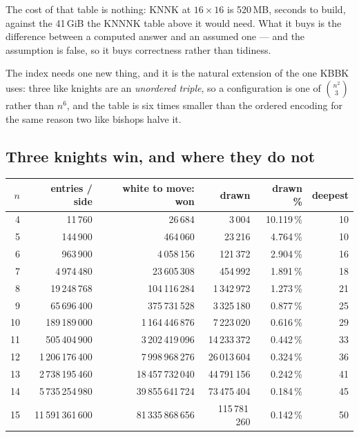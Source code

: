 \documentclass[11pt]{article}
\begin{document}
\noindent
The cost of that table is nothing: KNNK at $16\times16$ is 520\,MB, seconds to
build, against the 41\,GiB the KNNNK table above it would need. What it buys is
the difference between a computed answer and an assumed one --- and the
assumption is false, so it buys correctness rather than tidiness.

\smallskip
\noindent
The index needs one new thing, and it is the natural extension of the one KBBK
uses: three like knights are an \emph{unordered triple}, so a configuration is
one of $\binom{n^2}{3}$ rather than $n^6$, and the table is six times smaller
than the ordered encoding for the same reason two like bishops halve it.

\subsection{Three knights win, and where they do not}\label{sub:kn-win}

\begin{center}\small
\begin{tabular}{@{}rrrrrr@{}}
\toprule
$n$ & \textbf{entries / side} & \textbf{white to move: won} &
\textbf{drawn} & \textbf{drawn \%} & \textbf{deepest} \\
\midrule
 4 &          11\,760 &            26\,684 &        3\,004 & 10.119\,\% & 10 \\
 5 &        144\,900 &          464\,060 &      23\,216 &  4.764\,\% & 10 \\
 6 &        963\,900 &      4\,058\,156 &    121\,372 &  2.904\,\% & 16 \\
 7 &     4\,974\,480 &     23\,605\,308 &    454\,992 &  1.891\,\% & 18 \\
 8 &    19\,248\,768 &    104\,116\,284 & 1\,342\,972 &  1.273\,\% & 21 \\
 9 &    65\,696\,400 &    375\,731\,528 & 3\,325\,180 &  0.877\,\% & 25 \\
10 &   189\,189\,000 & 1\,164\,446\,876 & 7\,223\,020 &  0.616\,\% & 29 \\
11 &   505\,404\,900 & 3\,202\,419\,096 & 14\,233\,372 & 0.442\,\% & 33 \\
12 & 1\,206\,176\,400 & 7\,998\,968\,276 & 26\,013\,604 & 0.324\,\% & 36 \\
13 & 2\,738\,195\,460 & 18\,457\,732\,040 & 44\,791\,156 & 0.242\,\% & 41 \\
14 & 5\,735\,254\,980 & 39\,855\,641\,724 & 73\,475\,404 & 0.184\,\% & 45 \\
15 & 11\,591\,361\,600 & 81\,335\,868\,656 & 115\,781\,260 & 0.142\,\% & 50 \\
\bottomrule
\end{tabular}
\end{center}
\end{document}

